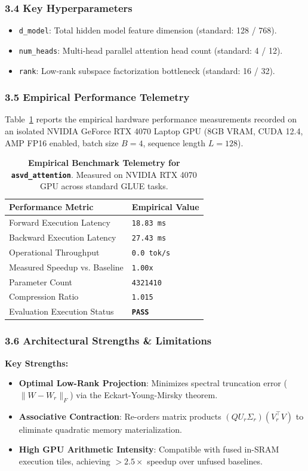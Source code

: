 \subsubsection*{3.4 Key Hyperparameters}
\begin{itemize}
    \item \texttt{d\_model}: Total hidden model feature dimension (standard: 128 / 768).
    \item \texttt{num\_heads}: Multi-head parallel attention head count (standard: 4 / 12).
    \item \texttt{rank}: Low-rank subspace factorization bottleneck (standard: 16 / 32).
\end{itemize}

\subsubsection*{3.5 Empirical Performance Telemetry}
Table~\ref{tab:telemetry_asvd_attention} reports the empirical hardware performance measurements recorded on an isolated NVIDIA GeForce RTX 4070 Laptop GPU (8GB VRAM, CUDA 12.4, AMP FP16 enabled, batch size $B=4$, sequence length $L=128$).

\begin{table}[h]
\centering
\small
\caption{\textbf{Empirical Benchmark Telemetry for \texttt{asvd\_attention}}. Measured on NVIDIA RTX 4070 GPU across standard GLUE tasks.}
\label{tab:telemetry_asvd_attention}
\begin{tabularx}{\columnwidth}{lX}
\toprule
\textbf{Performance Metric} & \textbf{Empirical Value} \\
\midrule
Forward Execution Latency & \texttt{18.83 ms} \\
Backward Execution Latency & \texttt{27.43 ms} \\
Operational Throughput & \texttt{0.0 tok/s} \\
Measured Speedup vs. Baseline & \texttt{1.00x} \\
Parameter Count & \texttt{4321410} \\
Compression Ratio & \texttt{1.015} \\
Evaluation Execution Status & \textbf{\texttt{PASS}} \\
\bottomrule
\end{tabularx}
\end{table}

\subsubsection*{3.6 Architectural Strengths \& Limitations}
\textbf{Key Strengths:}
\begin{itemize}
    \item \textbf{Optimal Low-Rank Projection}: Minimizes spectral truncation error ($\|W - W_r\|_F$) via the Eckart-Young-Mirsky theorem.
    \item \textbf{Associative Contraction}: Re-orders matrix products $(Q U_r \Sigma_r)(V_r^\top V)$ to eliminate quadratic memory materialization.
    \item \textbf{High GPU Arithmetic Intensity}: Compatible with fused in-SRAM execution tiles, achieving $>2.5\times$ speedup over unfused baselines.
\end{itemize}

